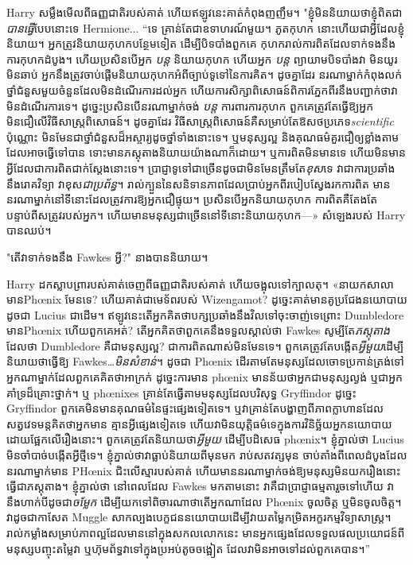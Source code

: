 Harry សម្លឹងមើលពីធញ្ញជាតិរបស់គាត់ ហើយឥឡូវនេះគាត់កំពុងញញឹម។ "ខ្ញុំមិននិយាយថាខ្ញុំពិតជា\emph{បានធ្វើ}បែបនោះទេ Hermione... “ទេ គ្រាន់តែជាឧទាហរណ៍មួយ។ ភូតកុហក នោះហើយជាអ្វីដែលខ្ញុំនិយាយ។ អ្នក​ត្រូវ​និយាយ​កុហក​បន្ថែម​ទៀត ដើម្បី​បិទបាំង​ពួកគេ កុហក​រាល់​ការ​ពិត​ដែល​ទាក់ទង​នឹង​ការ​កុហក​ដំបូង។ ហើយប្រសិនបើអ្នក \emph{បន្ត} និយាយកុហក ហើយអ្នក \emph{បន្ត} ព្យាយាមបិទបាំងវា មិនយូរមិនឆាប់ អ្នកនឹងត្រូវចាប់ផ្តើមនិយាយកុហកអំពីច្បាប់ទូទៅនៃការគិត។ ដូចគ្នាដែរ នរណាម្នាក់កំពុងលក់ថ្នាំជំនួសមួយចំនួនដែលមិនដំណើរការដល់អ្នក ហើយការសិក្សាពិសោធន៍ពិការភ្នែកពីរនឹងបញ្ជាក់ថាវាមិនដំណើរការទេ។ ដូច្នេះប្រសិនបើនរណាម្នាក់ចង់ \emph{បន្ត} ការពារការកុហក ពួកគេត្រូវតែធ្វើឱ្យអ្នកមិនជឿលើវិធីសាស្ត្រពិសោធន៍។ ដូចគ្នាដែរ វិធីសាស្ត្រពិសោធន៍គឺសម្រាប់តែឱសថប្រភេទ\emph{scientific} ប៉ុណ្ណោះ មិនមែនជាថ្នាំជំនួសដ៏អស្ចារ្យដូចថ្នាំទាំងនោះទេ។ ឬ​មនុស្ស​ល្អ និង​គុណធម៌​គួរ​ជឿ​ឲ្យ​ខ្លាំង​តាម​ដែល​អាច​ធ្វើ​ទៅ​បាន ទោះ​មាន​ភស្ដុតាង​និយាយ​យ៉ាង​ណា​ក៏​ដោយ។ ឬការពិតមិនមានទេ ហើយមិនមានអ្វីដែលជាការពិតជាក់ស្តែងនោះទេ។ ប្រាជ្ញាទូទៅជាច្រើនដូចជាមិនមែនត្រឹមតែ\emph{ខុស}ទេ វាជាការប្រឆាំងនឹងរោគវិទ្យា វាខុស\emph{ជាប្រព័ន្ធ}។ រាល់ក្បួននៃសនិទានភាពដែលប្រាប់អ្នកពីរបៀបស្វែងរកការពិត មាននរណាម្នាក់នៅទីនោះដែលត្រូវការឱ្យអ្នកជឿផ្ទុយ។ ប្រសិនបើអ្នកនិយាយកុហក ការពិតគឺតែងតែបន្ទាប់ពីសត្រូវរបស់អ្នក។ ហើយ​មាន​មនុស្ស​ជា​ច្រើន​នៅ​ទីនោះ​និយាយ​កុហក—» សំឡេង​របស់ Harry បាន​ឈប់។

"តើវាទាក់ទងនឹង Fawkes អ្វី?" នាងបាននិយាយ។

Harry ដកស្លាបព្រារបស់គាត់ចេញពីធញ្ញជាតិរបស់គាត់ ហើយចង្អុលទៅក្បាលតុ។ «នាយក​សាលា​មាន​ Phœnix មែន​ទេ? ហើយគាត់ជាមេទ័ពរបស់ Wizengamot? ដូច្នេះ​គាត់​មាន​គូប្រជែង​នយោបាយ​ដូចជា Lucius ជាដើម។ ឥឡូវ​នេះ​តើ​អ្នក​គិត​ថា​បក្ស​ប្រឆាំង​នឹង​វិល​ទៅ​ចុះ​ចាញ់​ទេ​ព្រោះ Dumbledore មាន​ Phœnix ហើយ​ពួក​គេ​អត់? តើអ្នកគិតថាពួកគេនឹងទទួលស្គាល់ថា Fawkes សូម្បីតែ\emph{ភស្តុតាង}ដែលថា Dumbledore គឺជាមនុស្សល្អ? ជាការពិតណាស់មិនមែនទេ។ ពួកគេត្រូវតែបង្កើត\emph{អ្វីមួយ}ដើម្បីនិយាយថាធ្វើឱ្យ Fawkes…\emph{មិនសំខាន់}។ ដូចជា Phœnix ដើរតាមតែមនុស្សដែលចោទប្រកាន់ត្រង់ទៅអ្នកណាម្នាក់ដែលពួកគេគិតថាអាក្រក់ ដូច្នេះការមាន phœnix មានន័យថាអ្នកជាមនុស្សល្ងង់ ឬជាអ្នកគាំទ្រដ៏គ្រោះថ្នាក់។ ឬ phœnixes គ្រាន់តែធ្វើតាមមនុស្សដែលបរិសុទ្ធ Gryffindor ដូច្នេះ Gryffindor ពួកគេមិនមានគុណធម៌នៃផ្ទះផ្សេងទៀតទេ។ ឬវាគ្រាន់តែបង្ហាញពីភាពក្លាហានដែលសត្វវេទមន្តគិតថាអ្នកមាន គ្មានអ្វីផ្សេងទៀតទេ ហើយវាមិនយុត្តិធម៌ទេក្នុងការវិនិច្ឆ័យអ្នកនយោបាយដោយផ្អែកលើរឿងនោះ។ ពួកគេត្រូវតែនិយាយថា\emph{អ្វីមួយ} ដើម្បីបដិសេធ phœnix។ ខ្ញុំភ្នាល់ថា Lucius មិនចាំបាច់បង្កើតអ្វីថ្មីទេ។ ខ្ញុំភ្នាល់ថាវាធ្លាប់និយាយពីមុនមក រាប់សតវត្សមុន ចាប់តាំងពីពេលដំបូងដែលនរណាម្នាក់មាន PHœnix ជិះលើស្មារបស់គាត់ ហើយមាននរណាម្នាក់ចង់ឱ្យមនុស្សមិនយករឿងនោះធ្វើជាភស្តុតាង។ ខ្ញុំភ្នាល់ថា នៅពេលដែល Fawkes មកតាមនោះ វាគឺជាប្រាជ្ញាធម្មតារួចទៅហើយ វានឹងហាក់បីដូចជា\emph{ចម្លែក} ដើម្បីយកទៅពិចារណាថាតើអ្នកណាដែល Phœnix ចូលចិត្ត ឬមិនចូលចិត្ត។ វាដូចជាកាសែត Muggle សាកល្បងបេក្ខជននយោបាយដើម្បីវាយតម្លៃកម្រិតអក្ខរកម្មវិទ្យាសាស្ត្រ។ រាល់កម្លាំងសម្រាប់ភាពល្អដែលមាននៅក្នុងសកលលោកនេះ មានអ្នកផ្សេងដែលទទួលផលប្រយោជន៍ពីមនុស្សបញ្ចុះតម្លៃវា ឬហ៊ុមព័ទ្ធវាទៅក្នុងប្រអប់តូចចង្អៀត ដែលវាមិនអាចទៅដល់ពួកគេបាន។”

